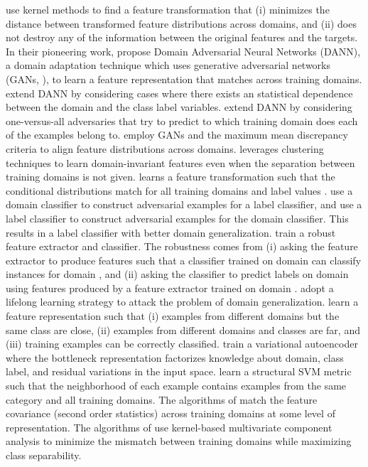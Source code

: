 \documentclass{article}
\begin{document}
\citet{muandet2013domain} use kernel methods to find a feature transformation that (i) minimizes the distance between transformed feature distributions across domains, and (ii) does not destroy any of the information between the original features and the targets.
In their pioneering work, \citet{ganin2016domain} propose Domain Adversarial Neural Networks (DANN), a domain adaptation technique which uses generative adversarial networks (GANs, \citet{goodfellow2014generative}), to learn a feature representation that matches across training domains.
\citet{akuzawa2019adversarial} extend DANN by considering cases where there exists an statistical dependence between the domain and the class label variables.
\citet{albuquerque2019a} extend DANN by considering one-versus-all adversaries that try to predict to which training domain does each of the examples belong to.
\citet{li2018domain} employ GANs and the maximum mean discrepancy criteria \citep{gretton2012kernel} to align feature distributions across domains.
\citet{matsuura2019domain} leverages clustering techniques to learn domain-invariant features even when the separation between training domains is not given.
\citet{li2018domain2, li2018deep} learns a feature transformation  such that the conditional distributions  match for all training domains  and label values .
\citet{shankar2018generalizing} use a domain classifier to construct adversarial examples for a label classifier, and use a label classifier to construct adversarial examples for the domain classifier. This results in a label classifier with better domain generalization. 
\citet{li2019episodic} train a robust feature extractor and classifier. The robustness comes from (i) asking the feature extractor to produce features such that a classifier trained on domain  can classify instances for domain , and (ii) asking the classifier to predict labels on domain  using features produced by a feature extractor trained on domain . 
\citet{li2020sequential} adopt a lifelong learning strategy to attack the problem of domain generalization.
\citet{motiian2017unified} learn a feature representation such that (i) examples from different domains but the same class are close, (ii) examples from different domains and classes are far, and (iii) training examples can be correctly classified.
\citet{ilse2019diva} train a variational autoencoder \citep{kingma2013auto} where the bottleneck representation factorizes knowledge about domain, class label, and residual variations in the input space.
\citet{fang2013unbiased} learn a structural SVM metric such that the neighborhood of each example contains examples from the same category and all training domains.
The algorithms of \citet{sun2016deep, sun2016return, rahman2019correlation} match the feature covariance (second order statistics) across training domains at some level of representation.
The algorithms of \citet{ghifary2016scatter, hu2019domain} use kernel-based multivariate component analysis to minimize the mismatch between training domains while maximizing class separability.
\end{document}
